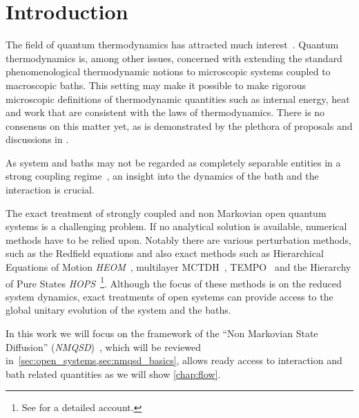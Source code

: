 \chapter{Introduction}
\label{chap:intro}
The field of quantum thermodynamics has attracted much
interest~\cite{Talkner2020Oct,Rivas2019Oct,Riechers2021Apr,Vinjanampathy2016Oct,Binder2018,Kurizki2021Dec}. Quantum
thermodynamics is, among other issues, concerned with extending the
standard phenomenological thermodynamic notions to microscopic systems
coupled to macroscopic baths. This setting may make it possible to
make rigorous microscopic definitions of thermodynamic quantities such
as internal energy, heat and work that are consistent with the laws of
thermodynamics. There is no consensus on this matter yet, as is
demonstrated by the plethora of proposals and discussions in
\cite{Rivas2019Oct,Talkner2020Oct,Motz2018Nov,Wiedmann2020Mar,Senior2020Feb,Kato2015Aug,Kato2016Dec,Strasberg2021Aug,Talkner2016Aug,Bera2021Feb,Bera2021Jun,Esposito2015Dec}.

As system and baths may not be regarded as completely separable
entities in a strong coupling
regime~\cite{Rivas2019Oct,Esposito2015Dec}, an insight into the
dynamics of the bath and the interaction is crucial.

The exact treatment of strongly coupled and non Markovian open quantum
systems is a challenging problem.  If no analytical solution is
available, numerical methods have to be relied upon. Notably there are
various perturbation methods, such as the Redfield equations and also
exact methods such as Hierarchical Equations of Motion
\emph{HEOM}~\cite{Tanimura1990Jun,Tang2015Dec}, multilayer
MCTDH~\cite{Wang2010May}, TEMPO~\cite{Strathearn2018Aug} and the
Hierarchy of Pure States \emph{HOPS}~\cite{Suess2014Oct}\footnote{See
  \cite{RichardDiss} for a detailed account.}. Although the focus of
these methods is on the reduced system dynamics, exact treatments of
open systems can provide access to the global unitary evolution of the
system and the baths.


In this work we will focus on the framework of the ``Non Markovian
State Diffusion'' (\emph{NMQSD})~\cite{Diosi1998Mar}, which will be
reviewed in~\cref{sec:open_systems,sec:nmqsd_basics}, allows ready
access to interaction and bath related quantities as we will show
\cref{chap:flow}.

